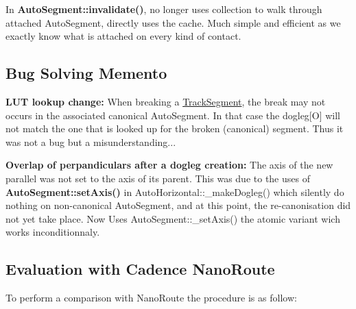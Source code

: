 \begin{DoxyItemize}
\item In \textbf{ Auto\+Segment\+::invalidate()}, no longer uses collection to walk through attached Auto\+Segment, directly uses the cache. Much simple and efficient as we exactly know what is attached on every kind of contact.
\end{DoxyItemize}\hypertarget{pageNotes_ssecBugBusting}{}\subsection{Bug Solving Memento}\label{pageNotes_ssecBugBusting}
{\bfseries L\+UT lookup change\+:} When breaking a \hyperlink{classKite_1_1TrackSegment}{Track\+Segment}, the break may not occurs in the associated canonical Auto\+Segment. In that case the {\ttfamily dogleg\mbox{[}O\mbox{]}} will not match the one that is looked up for the broken (canonical) segment. Thus it was not a bug but a misunderstanding...

{\bfseries Overlap of perpandiculars after a dogleg creation\+:} The axis of the new parallel was not set to the axis of it\textquotesingle{}s parent. This was due to the uses of \textbf{ Auto\+Segment\+::set\+Axis()} in Auto\+Horizontal\+::\+\_\+make\+Dogleg() which silently do nothing on non-\/canonical Auto\+Segment, and at this point, the re-\/canonisation did not yet take place. Now Uses Auto\+Segment\+::\+\_\+set\+Axis() the atomic variant wich works inconditionnaly.\hypertarget{pageNotes_ssecNanoRoute}{}\subsection{Evaluation with Cadence Nano\+Route}\label{pageNotes_ssecNanoRoute}
To perform a comparison with Nano\+Route the procedure is as follow\+:


